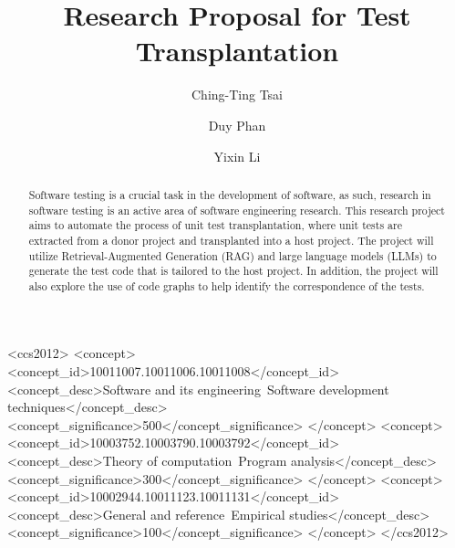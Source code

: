 \documentclass[sigconf]{acmart}
\begin{document}
\title{Research Proposal for Test Transplantation}

\author{Ching-Ting Tsai}

\author{Duy Phan}

\author{Yixin Li}


\renewcommand{\shortauthors}{Trovato et al.}

\begin{abstract}
Software testing is a crucial task in the development of software, as such, research in software testing is an active area of software engineering research. This research project aims to automate the process of unit test transplantation, where unit tests are extracted from a donor project and transplanted into a host project. The project will utilize Retrieval-Augmented Generation (RAG) and large language models (LLMs) to generate the test code that is tailored to the host project. In addition, the project will also explore the use of code graphs to help identify the correspondence of the tests.
\end{abstract}

\begin{CCSXML}
<ccs2012>
  <concept>
  <concept_id>10011007.10011006.10011008</concept_id>
  <concept_desc>Software and its engineering~Software development techniques</concept_desc>
  <concept_significance>500</concept_significance>
  </concept>
  <concept>
  <concept_id>10003752.10003790.10003792</concept_id>
  <concept_desc>Theory of computation~Program analysis</concept_desc>
  <concept_significance>300</concept_significance>
  </concept>
  <concept>
  <concept_id>10002944.10011123.10011131</concept_id>
  <concept_desc>General and reference~Empirical studies</concept_desc>
  <concept_significance>100</concept_significance>
  </concept>
</ccs2012>
\end{CCSXML}
\end{document}

